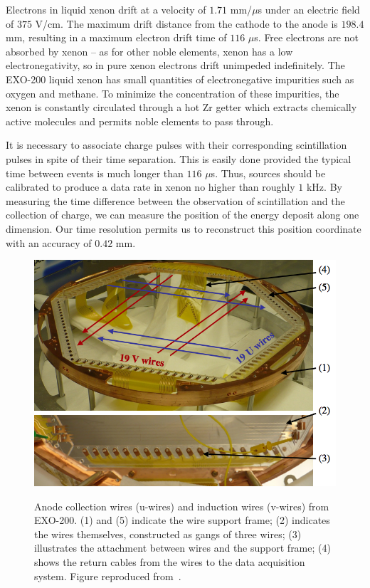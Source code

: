 Electrons in liquid xenon drift at a velocity of $1.71$ mm/$\mu$s under an electric field of $375$ V/cm.  The maximum drift distance from the cathode to the anode is $198.4$ mm, resulting in a maximum electron drift time of $116$ $\mu$s.  Free electrons are not absorbed by xenon -- as for other noble elements, xenon has a low electronegativity, so in pure xenon electrons drift unimpeded indefinitely.  The EXO-200 liquid xenon has small quantities of electronegative impurities such as oxygen and methane. To minimize the concentration of these impurities, the xenon is constantly circulated through a hot Zr getter which extracts chemically active molecules and permits noble elements to pass through.~\cite{detectorPartI}

It is necessary to associate charge pulses with their corresponding scintillation pulses in spite of their time separation.  This is easily done provided the typical time between events is much longer than $116$ $\mu$s.  Thus, sources should be calibrated to produce a data rate in xenon no higher than roughly $1$ kHz.  By measuring the time difference between the observation of scintillation and the collection of charge, we can measure the position of the energy deposit along one dimension.  Our time resolution permits us to reconstruct this position coordinate with an accuracy of $0.42$ mm.~\cite{bb2nEXO2014}

\begin{figure}
\begin{center}
\includegraphics[keepaspectratio=true,width=\textwidth]{supportwithoutwires.png}
\end{center}
\renewcommand{\baselinestretch}{1}
\small\normalsize
\begin{quote}
\caption{Anode collection wires (u-wires) and induction wires (v-wires) from EXO-200.  (1) and (5) indicate the wire support frame; (2) indicates the wires themselves, constructed as gangs of three wires; (3) illustrates the attachment between wires and the support frame; (4) shows the return cables from the wires to the data acquisition system.  Figure reproduced from~\cite{detectorPartI}.}
\label{fig:UandVWiresCrossing}
\end{quote}
\end{figure}
\renewcommand{\baselinestretch}{2}
\small\normalsize

